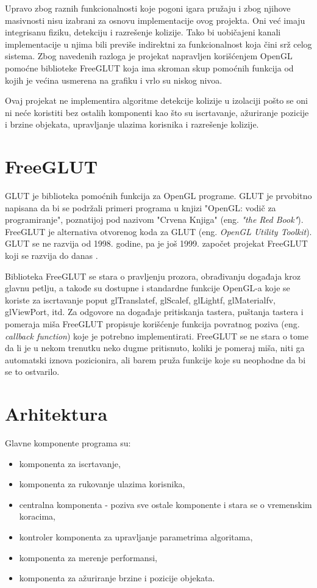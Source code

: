 \documentclass[12pt,oneside]{memoir}
\begin{document}
Upravo zbog raznih funkcionalnosti koje pogoni igara pružaju i zbog njihove masivnosti nisu izabrani
za osnovu implementacije ovog projekta. Oni već imaju integrisanu fiziku, detekciju 
i razrešenje kolizije. Tako bi uobičajeni kanali implementacije u njima 
bili previše indirektni za funkcionalnost koja čini srž celog sistema.
Zbog navedenih razloga je projekat napravljen korišćenjem OpenGL pomoćne 
biblioteke FreeGLUT  koja ima skroman skup pomoćnih
funkcija od kojih je većina usmerena na grafiku i vrlo su niskog nivoa.

Ovaj projekat ne implementira algoritme detekcije kolizije u izolaciji pošto 
se oni ni neće koristiti bez ostalih komponenti kao što su iscrtavanje, ažuriranje pozicije i brzine objekata,
upravljanje ulazima korisnika i razrešenje kolizije.

\section{FreeGLUT}

GLUT je biblioteka pomoćnih funkcija za OpenGL programe.
GLUT je prvobitno napisana da bi se podržali primeri programa u knjizi "OpenGL:
vodič za programiranje", poznatijoj pod nazivom "Crvena Knjiga" (eng. {\em "the Red Book"}).
FreeGLUT je alternativa otvorenog koda za GLUT (eng. {\em OpenGL Utility Toolkit}). 
GLUT se ne razvija od 1998. godine, pa je još 1999. započet projekat FreeGLUT  koji 
se razvija do danas \cite{freeglut}. 

Biblioteka FreeGLUT se stara o pravljenju prozora, obrađivanju događaja kroz glavnu petlju,
a takođe su dostupne i standardne funkcije OpenGL-a koje se koriste
za iscrtavanje poput glTranslatef, glScalef, glLightf, glMaterialfv, glViewPort, itd.
Za odgovore na događaje pritiskanja tastera, puštanja tastera i pomeraja miša
FreeGLUT propisuje korišćenje funkcija povratnog poziva  (eng. {\em callback function}) koje je potrebno implementirati.
FreeGLUT se ne stara o tome da li je u nekom trenutku neko dugme pritisnuto, 
koliki je pomeraj miša, niti ga automatski iznova pozicionira, ali barem pruža 
funkcije koje su neophodne da bi se to ostvarilo.

\section{Arhitektura}

Glavne komponente programa su:
\begin{itemize}
	\item komponenta za iscrtavanje,
	\item komponenta za rukovanje ulazima korisnika,
	\item centralna komponenta - poziva sve ostale komponente i stara se o vremenskim koracima,
	\item kontroler komponenta za upravljanje parametrima algoritama,
	\item komponenta za merenje performansi,
	\item komponenta za ažuriranje brzine i pozicije objekata.
\end{itemize}
\end{document}
